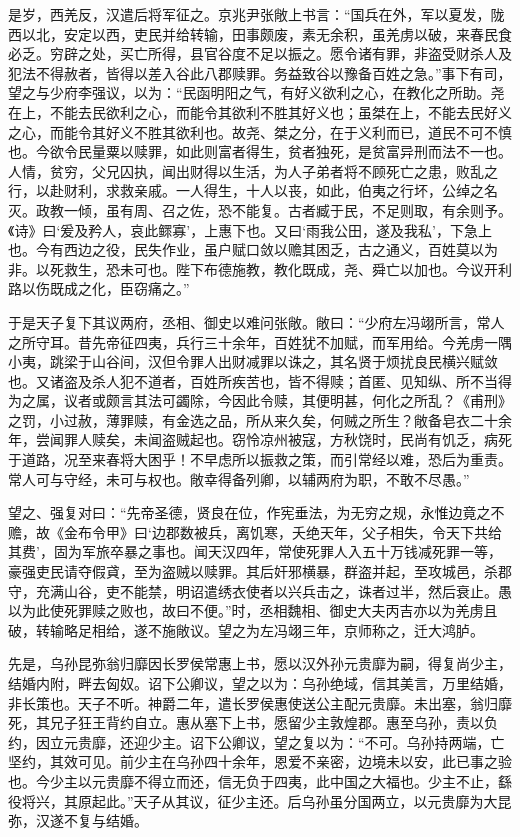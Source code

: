 \documentclass[]{article}
\begin{document}
是岁，西羌反，汉遣后将军征之。京兆尹张敞上书言：``国兵在外，军以夏发，陇西以北，安定以西，吏民并给转输，田事颇废，素无余积，虽羌虏以破，来春民食必乏。穷辟之处，买亡所得，县官谷度不足以振之。愿令诸有罪，非盗受财杀人及犯法不得赦者，皆得以差入谷此八郡赎罪。务益致谷以豫备百姓之急。''事下有司，望之与少府李强议，以为：``民函明阳之气，有好义欲利之心，在教化之所助。尧在上，不能去民欲利之心，而能令其欲利不胜其好义也；虽桀在上，不能去民好义之心，而能令其好义不胜其欲利也。故尧、桀之分，在于义利而已，道民不可不慎也。今欲令民量粟以赎罪，如此则富者得生，贫者独死，是贫富异刑而法不一也。人情，贫穷，父兄囚执，闻出财得以生活，为人子弟者将不顾死亡之患，败乱之行，以赴财利，求救亲戚。一人得生，十人以丧，如此，伯夷之行坏，公绰之名灭。政教一倾，虽有周、召之佐，恐不能复。古者臧于民，不足则取，有余则予。《诗》曰`爰及矜人，哀此鳏寡'，上惠下也。又曰`雨我公田，遂及我私'，下急上也。今有西边之役，民失作业，虽户赋口敛以赡其困乏，古之通义，百姓莫以为非。以死救生，恐未可也。陛下布德施教，教化既成，尧、舜亡以加也。今议开利路以伤既成之化，臣窃痛之。''

于是天子复下其议两府，丞相、御史以难问张敞。敞曰：``少府左冯翊所言，常人之所守耳。昔先帝征四夷，兵行三十余年，百姓犹不加赋，而军用给。今羌虏一隅小夷，跳梁于山谷间，汉但令罪人出财减罪以诛之，其名贤于烦扰良民横兴赋敛也。又诸盗及杀人犯不道者，百姓所疾苦也，皆不得赎；首匿、见知纵、所不当得为之属，议者或颇言其法可蠲除，今因此令赎，其便明甚，何化之所乱？《甫刑》之罚，小过赦，薄罪赎，有金选之品，所从来久矣，何贼之所生？敞备皂衣二十余年，尝闻罪人赎矣，未闻盗贼起也。窃怜凉州被寇，方秋饶时，民尚有饥乏，病死于道路，况至来春将大困乎！不早虑所以振救之策，而引常经以难，恐后为重责。常人可与守经，未可与权也。敞幸得备列卿，以辅两府为职，不敢不尽愚。''

望之、强复对曰：``先帝圣德，贤良在位，作宪垂法，为无穷之规，永惟边竟之不赡，故《金布令甲》曰`边郡数被兵，离饥寒，夭绝天年，父子相失，令天下共给其费'，固为军旅卒暴之事也。闻天汉四年，常使死罪人入五十万钱减死罪一等，豪强吏民请夺假貣，至为盗贼以赎罪。其后奸邪横暴，群盗并起，至攻城邑，杀郡守，充满山谷，吏不能禁，明诏遣绣衣使者以兴兵击之，诛者过半，然后衰止。愚以为此使死罪赎之败也，故曰不便。''时，丞相魏相、御史大夫丙吉亦以为羌虏且破，转输略足相给，遂不施敞议。望之为左冯翊三年，京师称之，迁大鸿胪。

先是，乌孙昆弥翁归靡因长罗侯常惠上书，愿以汉外孙元贵靡为嗣，得复尚少主，结婚内附，畔去匈奴。诏下公卿议，望之以为：乌孙绝域，信其美言，万里结婚，非长策也。天子不听。神爵二年，遣长罗侯惠使送公主配元贵靡。未出塞，翁归靡死，其兄子狂王背约自立。惠从塞下上书，愿留少主敦煌郡。惠至乌孙，责以负约，因立元贵靡，还迎少主。诏下公卿议，望之复以为：``不可。乌孙持两端，亡坚约，其效可见。前少主在乌孙四十余年，恩爱不亲密，边境未以安，此已事之验也。今少主以元贵靡不得立而还，信无负于四夷，此中国之大福也。少主不止，繇役将兴，其原起此。''天子从其议，征少主还。后乌孙虽分国两立，以元贵靡为大昆弥，汉遂不复与结婚。
\end{document}
